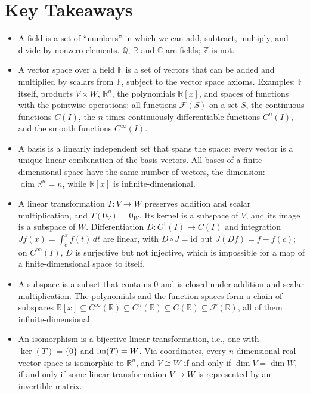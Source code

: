 \section{Key Takeaways}
\begin{itemize}[leftmargin=*]
	\item A field is a set of ``numbers'' in which we can add, subtract, multiply, and divide by nonzero elements. $\mathbb{Q}$, $\mathbb{R}$ and $\mathbb{C}$ are fields; $\mathbb{Z}$ is not.
	\item A vector space over a field $\mathbb{F}$ is a set of vectors that can be added and multiplied by scalars from $\mathbb{F}$, subject to the vector space axioms. Examples: $\mathbb{F}$ itself, products $V \times W$, $\mathbb{R}^n$, the polynomials $\mathbb{R}[x]$, and spaces of functions with the pointwise operations: all functions $\mathcal{F}(S)$ on a set $S$, the continuous functions $C(I)$, the $n$ times continuously differentiable functions $C^n(I)$, and the smooth functions $C^\infty(I)$.
	\item A basis is a linearly independent set that spans the space; every vector is a unique linear combination of the basis vectors. All bases of a finite-dimensional space have the same number of vectors, the dimension: $\dim \mathbb{R}^n = n$, while $\mathbb{R}[x]$ is infinite-dimensional.
	\item A linear transformation $T: V \to W$ preserves addition and scalar multiplication, and $T(0_V) = 0_W$. Its kernel is a subspace of $V$, and its image is a subspace of $W$. Differentiation $D: C^1(I) \to C(I)$ and integration $J f(x) = \int_c^x f(t)\, dt$ are linear, with $D \circ J = \mathrm{id}$ but $J(Df) = f - f(c)$; on $C^\infty(I)$, $D$ is surjective but not injective, which is impossible for a map of a finite-dimensional space to itself.
	\item A subspace is a subset that contains $0$ and is closed under addition and scalar multiplication. The polynomials and the function spaces form a chain of subspaces $\mathbb{R}[x] \subseteq C^\infty(\mathbb{R}) \subseteq C^n(\mathbb{R}) \subseteq C(\mathbb{R}) \subseteq \mathcal{F}(\mathbb{R})$, all of them infinite-dimensional.
	\item An isomorphism is a bijective linear transformation, i.e., one with $\ker(T) = \{0\}$ and $\operatorname{im}(T) = W$. Via coordinates, every $n$-dimensional real vector space is isomorphic to $\mathbb{R}^n$, and $V \cong W$ if and only if $\dim V = \dim W$, if and only if some linear transformation $V \to W$ is represented by an invertible matrix.

\end{itemize}
